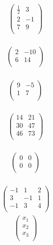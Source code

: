 \documentclass{article}
\begin{document}
\begin{align*}
\begin{pmatrix}
\frac{1}{2} & 3\\
2 & -1\\
7 & 9\\
\end{pmatrix}
\end{align*}
\\
\begin{align*}
\begin{pmatrix}
2 & -10\\
6 & 14\\
\end{pmatrix}
\end{align*}
\\
\begin{align*}
\begin{pmatrix}
9 & -5\\
1 & 7\\
\end{pmatrix}
\end{align*}
\\
\begin{align*}
\begin{pmatrix}
14 & 21\\
30 & 47\\
46 & 73\\
\end{pmatrix}
\end{align*}
\\
\begin{align*}
\begin{pmatrix}
0 & 0\\
0 & 0\\
\end{pmatrix}
\end{align*}
\\
\begin{align*}
\begin{pmatrix}
-1 & 1 & 2\\
3 & -1 & 1\\
-1 & 3 & 4\\
\end{pmatrix}
\end{align*}
\begin{align*}
\begin{pmatrix}
x_{1}\\
x_{2}\\
x_{3}\\
\end{pmatrix}
\end{align*}
\end{document}
